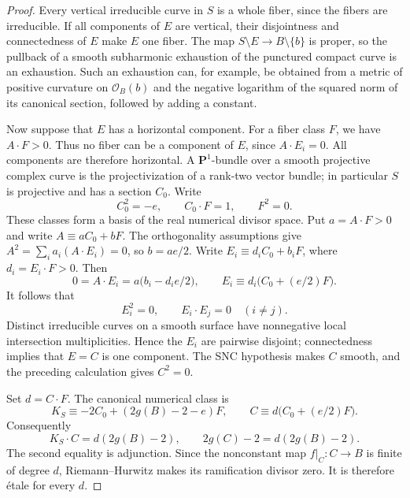 \documentclass[11pt]{amsart}
\theoremstyle{definition}
\theoremstyle{remark}
\numberwithin{equation}{section}
\newcommand{\PP}{\mathbf P}
\begin{document}
\begin{proof}
Every vertical irreducible curve in $S$ is a whole fiber, since the fibers
are irreducible. If all components of $E$ are vertical, their disjointness
and connectedness of $E$ make $E$ one fiber. The map
$S\setminus E\to B\setminus\{b\}$ is proper, so the pullback of a smooth
subharmonic exhaustion of the punctured compact curve is an exhaustion.
Such an exhaustion can, for example, be obtained from a metric of positive
curvature on $\mathcal O_B(b)$ and the negative logarithm of the squared
norm of its canonical section, followed by adding a constant.

Now suppose that $E$ has a horizontal component. For a fiber class $F$,
we have $A\cdot F>0$. Thus no fiber can be a component of $E$, since
$A\cdot E_i=0$. All components are therefore horizontal.
A $\PP^1$-bundle over a smooth projective complex curve is the
projectivization of a rank-two vector bundle; in particular $S$ is
projective and has a section $C_0$. Write
\[
 C_0^2=-e,\qquad C_0\cdot F=1,\qquad F^2=0.
\]
These classes form a basis of the real numerical divisor space.
Put $a=A\cdot F>0$ and write $A\equiv aC_0+bF$.
The orthogonality assumptions give $A^2=\sum_i a_i(A\cdot E_i)=0$,
so $b=ae/2$. Write $E_i\equiv d_iC_0+b_iF$, where
$d_i=E_i\cdot F>0$. Then
\[
 0=A\cdot E_i=a\bigl(b_i-d_ie/2\bigr),
 \qquad E_i\equiv d_i\bigl(C_0+(e/2)F\bigr).
\]
It follows that
\[
 E_i^2=0,\qquad E_i\cdot E_j=0\quad(i\ne j).
\]
Distinct irreducible curves on a smooth surface have nonnegative local
intersection multiplicities. Hence the $E_i$ are pairwise disjoint;
connectedness implies that $E=C$ is one component. The SNC hypothesis
makes $C$ smooth, and the preceding calculation gives $C^2=0$.

Set $d=C\cdot F$. The canonical numerical class is
\[
 K_S\equiv-2C_0+(2g(B)-2-e)F,
 \qquad C\equiv d\bigl(C_0+(e/2)F\bigr).
\]
Consequently
\[
 K_S\cdot C=d(2g(B)-2),\qquad
 2g(C)-2=d(2g(B)-2).
\]
The second equality is adjunction. Since the nonconstant map
$f|_C:C\to B$ is finite of degree $d$, Riemann--Hurwitz makes its
ramification divisor zero. It is therefore \'etale for every $d$.


\end{proof}
\end{document}
